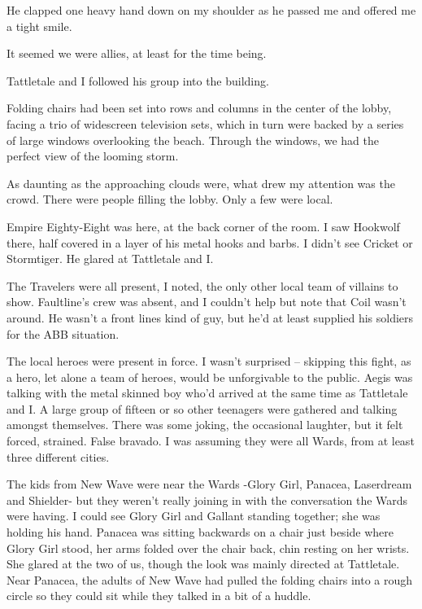 He clapped one heavy hand down on my shoulder as he passed me and offered me a tight smile.



It seemed we were allies, at least for the time being.



Tattletale and I followed his group into the building.



Folding chairs had been set into rows and columns in the center of the lobby, facing a trio of widescreen television sets, which in turn were backed by a series of large windows overlooking the beach.  Through the windows, we had the perfect view of the looming storm.



As daunting as the approaching clouds were, what drew my attention was the crowd.  There were people filling the lobby.  Only a few were local.



Empire Eighty-Eight was here, at the back corner of the room.  I saw Hookwolf there, half covered in a layer of his metal hooks and barbs.  I didn't see Cricket or Stormtiger.  He glared at Tattletale and I.



The Travelers were all present, I noted, the only other local team of villains to show.  Faultline's crew was absent, and I couldn't help but note that Coil wasn't around.  He wasn't a front lines kind of guy, but he'd at least supplied his soldiers for the ABB situation.



The local heroes were present in force.  I wasn't surprised – skipping this fight, as a hero, let alone a team of heroes, would be unforgivable to the public.  Aegis was talking with the metal skinned boy who'd arrived at the same time as Tattletale and I.  A large group of fifteen or so other teenagers were gathered and talking amongst themselves.  There was some joking, the occasional laughter, but it felt forced, strained.  False bravado.  I was assuming they were all Wards, from at least three different cities.



The kids from New Wave were near the Wards -Glory Girl, Panacea, Laserdream and Shielder- but they weren't really joining in with the conversation the Wards were having.  I could see Glory Girl and Gallant standing together; she was holding his hand.  Panacea was sitting backwards on a chair just beside where Glory Girl stood, her arms folded over the chair back, chin resting on her wrists.  She glared at the two of us, though the look was mainly directed at Tattletale.  Near Panacea, the adults of New Wave had pulled the folding chairs into a rough circle so they could sit while they talked in a bit of a huddle.



